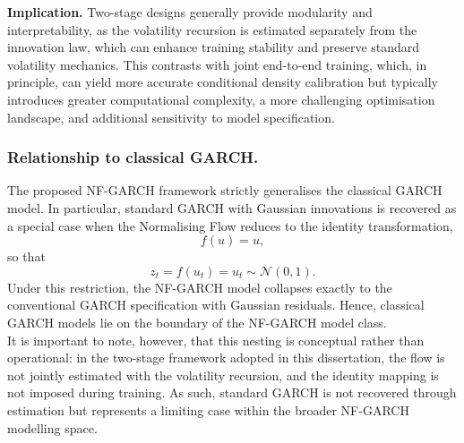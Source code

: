 \documentclass[oneside,12pt]{CUEDthesisPSnPDF}
\begin{document}
\medskip
\noindent
\textbf{Implication.}
Two-stage designs generally provide modularity and interpretability, as the volatility recursion is estimated separately from the innovation law, which can enhance training stability and preserve standard volatility mechanics. This contrasts with joint end-to-end training, which, in principle, can yield more accurate conditional density calibration but typically introduces greater computational complexity, a more challenging optimisation landscape, and additional sensitivity to model specification.\\

\subsubsection{Relationship to classical GARCH.}
The proposed NF-GARCH framework strictly generalises the classical GARCH model. In particular, standard GARCH with Gaussian innovations is recovered as a special case when the Normalising Flow reduces to the identity transformation,\\
\[
f(u) = u,
\]
so that
\[
z_t = f(u_t) = u_t \sim \mathcal{N}(0,1).
\]
Under this restriction, the NF-GARCH model collapses exactly to the conventional GARCH specification with Gaussian residuals. Hence, classical GARCH models lie on the boundary of the NF-GARCH model class.\\

It is important to note, however, that this nesting is conceptual rather than operational: in the two-stage framework adopted in this dissertation, the flow is not jointly estimated with the volatility recursion, and the identity mapping is not imposed during training. As such, standard GARCH is not recovered through estimation but represents a limiting case within the broader NF-GARCH modelling space.\\
\end{document}
